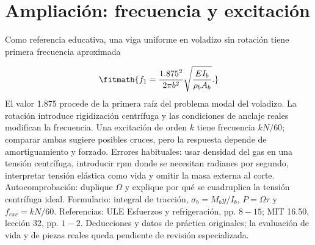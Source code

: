 \documentclass[10pt,openany]{book}
\begin{document}
\section{Ampliación: frecuencia y excitación}

Como referencia educativa, una viga uniforme en voladizo sin rotación tiene primera frecuencia aproximada

\[
\fitmath{f_1=\frac{1.875^2}{2\pi b^2}\sqrt{\frac{EI_b}{\rho_bA_b}}.}
\]
El valor 1.875 procede de la primera raíz del problema modal del voladizo. La rotación introduce rigidización centrífuga y las condiciones de anclaje reales modifican la frecuencia. Una excitación de orden \(k\) tiene frecuencia \(kN/60\); comparar ambas sugiere posibles cruces, pero la respuesta depende de amortiguamiento y forzado.
Errores habituales: usar densidad del gas en una tensión centrífuga, introducir rpm donde se necesitan radianes por segundo, interpretar tensión elástica como vida y omitir la masa externa al corte. Autocomprobación: duplique \(\Omega\) y explique por qué se cuadruplica la tensión centrífuga ideal.
Formulario: integral de tracción, \(\sigma_b=M_by/I_b\), \(P=\Omega\tau\) y \(f_{exc}=kN/60\). Referencias: ULE Esfuerzos y refrigeración, pp. \(8-15\); MIT 16.50, lección 32, pp. \(1-2\). Deducciones y datos de práctica originales; la evaluación de vida y de piezas reales queda pendiente de revisión especializada.
\end{document}
